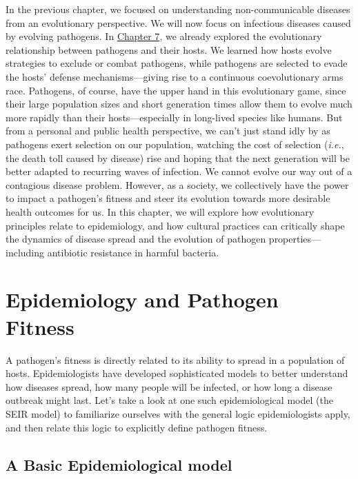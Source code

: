 \documentclass[
]{book}
\begin{document}
In the previous chapter, we focused on understanding non-communicable diseases from an evolutionary perspective. We will now focus on infectious diseases caused by evolving pathogens. In \href{evolution-of-dna-sequences.html\#case-study-sars-cov-2}{Chapter 7}, we already explored the evolutionary relationship between pathogens and their hosts. We learned how hosts evolve strategies to exclude or combat pathogens, while pathogens are selected to evade the hosts' defense mechanisms---giving rise to a continuous coevolutionary arms race. Pathogens, of course, have the upper hand in this evolutionary game, since their large population sizes and short generation times allow them to evolve much more rapidly than their hosts---especially in long-lived species like humans. But from a personal and public health perspective, we can't just stand idly by as pathogens exert selection on our population, watching the cost of selection (\emph{i.e.}, the death toll caused by disease) rise and hoping that the next generation will be better adapted to recurring waves of infection. We cannot evolve our way out of a contagious disease problem. However, as a society, we collectively have the power to impact a pathogen's fitness and steer its evolution towards more desirable health outcomes for us. In this chapter, we will explore how evolutionary principles relate to epidemiology, and how cultural practices can critically shape the dynamics of disease spread and the evolution of pathogen properties---including antibiotic resistance in harmful bacteria.

\hypertarget{epidemiology-and-pathogen-fitness}{%
\section{Epidemiology and Pathogen Fitness}\label{epidemiology-and-pathogen-fitness}}

A pathogen's fitness is directly related to its ability to spread in a population of hosts. Epidemiologists have developed sophisticated models to better understand how diseases spread, how many people will be infected, or how long a disease outbreak might last. Let's take a look at one such epidemiological model (the SEIR model) to familiarize ourselves with the general logic epidemiologists apply, and then relate this logic to explicitly define pathogen fitness.

\hypertarget{a-basic-epidemiological-model}{%
\subsection{A Basic Epidemiological model}\label{a-basic-epidemiological-model}}
\end{document}
